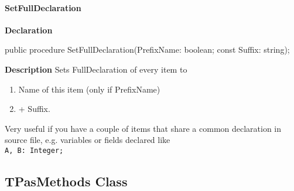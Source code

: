 \documentclass{report}
\newif\ifpdf
\begin{document}
\paragraph*{SetFullDeclaration}\hspace*{\fill}

\label{PasDoc_Items.TPasItems-SetFullDeclaration}
\begin{list}{}{
\setlength{\itemindent}{0cm}
\setlength{\listparindent}{0cm}
\setlength{\leftmargin}{\evensidemargin}
\addtolength{\leftmargin}{\tmplength}
\settowidth{\labelsep}{X}
\addtolength{\leftmargin}{\labelsep}
\setlength{\labelwidth}{\tmplength}
}
\item[\textbf{Declaration}\hfill]
\ifpdf
\begin{flushleft}
\fi
\begin{ttfamily}
public procedure SetFullDeclaration(PrefixName: boolean; const Suffix: string);\end{ttfamily}

\ifpdf
\end{flushleft}
\fi

\par
\item[\textbf{Description}]
Sets FullDeclaration of every item to \begin{enumerate}
\setcounter{enumi}{0} \setcounter{enumii}{0} \setcounter{enumiii}{0} \setcounter{enumiv}{0} 
\item Name of this item (only if PrefixName)
\setcounter{enumi}{1} \setcounter{enumii}{1} \setcounter{enumiii}{1} \setcounter{enumiv}{1} 
\item + Suffix.
\end{enumerate} Very useful if you have a couple of items that share a common declaration in source file, e.g. variables or fields declared like \texttt{\\\nopagebreak[3]
A,~B:~Integer;\\
}

\end{list}
\ifpdf
\subsection*{\large{\textbf{TPasMethods Class}}\normalsize\hspace{1ex}\hrulefill}
\else
\subsection*{TPasMethods Class}
\fi
\label{PasDoc_Items.TPasMethods}
\end{document}
